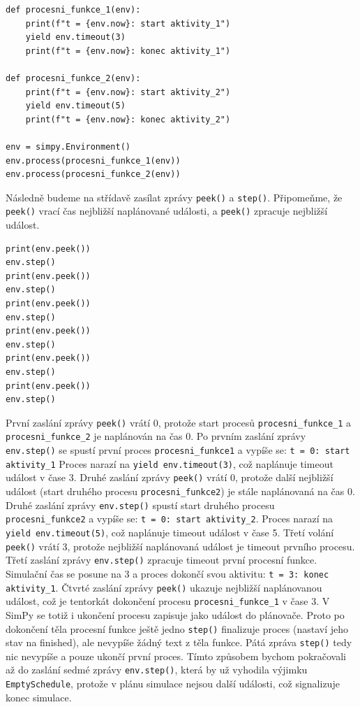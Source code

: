 \documentclass[
  program=itp,
  biblatex,
  figures=false,
  glossaries,
  index
]{kidiplom}
\begin{document}
 \begin{verbatim} 
def procesni_funkce_1(env):
    print(f"t = {env.now}: start aktivity_1")
    yield env.timeout(3)
    print(f"t = {env.now}: konec aktivity_1")

def procesni_funkce_2(env):
    print(f"t = {env.now}: start aktivity_2")
    yield env.timeout(5)
    print(f"t = {env.now}: konec aktivity_2")

env = simpy.Environment()
env.process(procesni_funkce_1(env))
env.process(procesni_funkce_2(env))

\end{verbatim}

\noindent Následně budeme na střídavě zasílat zprávy \texttt{peek()} a \texttt{step()}. Připomeňme, že \texttt{peek()}  vrací čas nejbližší naplánované události, a \texttt{peek()} zpracuje nejbližší událost.

 \begin{verbatim} 
print(env.peek())
env.step()
print(env.peek())
env.step()
print(env.peek())
env.step()
print(env.peek())
env.step()
print(env.peek())
env.step()
print(env.peek())
env.step()
\end{verbatim}

\noindent První zaslání zprávy \texttt{peek()} vrátí 0, protože start procesů \texttt{procesni\_funkce\_1} a \texttt{procesni\_funkce\_2} je naplánován na čas 0. 
Po prvním zaslání zprávy \texttt{env.step()} se spustí první proces \texttt{procesni\_funkce1} a vypíše se: \texttt{t = 0: start aktivity\_1}
Proces narazí na \texttt{yield env.timeout(3)}, což naplánuje timeout událost v čase 3. Druhé zaslání zprávy \texttt{peek()} vrátí 0, protože další nejbližší událost (start druhého procesu \texttt{procesni\_funkce2}) je stále naplánovaná na čas 0. Druhé zaslání zprávy \texttt{env.step()} spustí start druhého procesu \texttt{procesni\_funkce2} a vypíše se: \texttt{t = 0: start aktivity\_2}. Proces narazí na \texttt{yield env.timeout(5)}, což naplánuje timeout událost v čase 5. Třetí volání \texttt{peek()} vrátí 3, protože nejbližší naplánovaná událost je timeout prvního procesu. Třetí zaslání zprávy \texttt{env.step()} zpracuje timeout první procesní funkce. Simulační čas se posune na 3 a proces dokončí svou aktivitu: \texttt{t = 3: konec aktivity\_1}. Čtvrté zaslání zprávy \texttt{peek()} ukazuje nejbližší naplánovanou událost, což je tentorkát dokončení procesu \texttt{procesni\_funkce\_1} v čase 3. V SimPy se totiž i ukončení procesu zapisuje jako událost do plánovače. Proto po dokončení těla procesní funkce ještě jedno \texttt{step()} finalizuje proces (nastaví jeho stav na finished), ale nevypíše žádný text z těla funkce. Pátá zpráva \texttt{step()} tedy nic nevypíše a pouze ukončí první proces.
Tímto způsobem bychom pokračovali až do zaslání sedmé zprávy \texttt{env.step()}, která by už vyhodila výjimku \texttt{EmptySchedule}, protože v plánu simulace nejsou další události, což signalizuje konec simulace.
\end{document}
